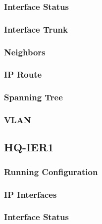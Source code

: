\subsubsection{Interface Status}


\subsubsection{Interface Trunk}


\subsubsection{Neighbors}


\subsubsection{IP Route}


\subsubsection{Spanning Tree}


\subsubsection{VLAN}




\subsection{HQ-IER1}
\subsubsection{Running Configuration}


\subsubsection{IP Interfaces}


\subsubsection{Interface Status}


